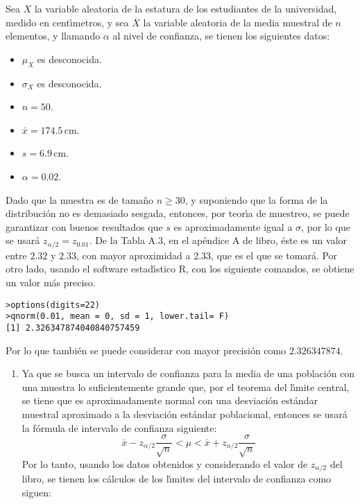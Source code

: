 \begin{solucion}
 Sea $X$ la variable aleatoria de la estatura de los estudiantes de la universidad, medido en cent\'{\i}metros, y sea $\overline{X}$ la variable aleatoria de la media muestral de $n$ elementos, y llamando $\alpha$ al nivel de confianza, se tienen los siguientes datos:
 \begin{itemize}
  \item $\mu_X$ es desconocida.
  \item $\sigma_X$ es desconocida.
  \item $n = 50$.
  \item $\bar{x} = 174.5\,$cm.
  \item $s=6.9\,$cm.
  \item $\alpha=0.02$.
 \end{itemize}
 Dado que la muestra es de tama\~no $n\geq 30$, y suponiendo que la forma de la distribuci\'on no es demasiado sesgada, entonces, por teor\'{\i}a de muestreo, se puede garantizar con buenos resultados que $s$ es aproximadamente igual a $\sigma$, por lo que se usar\'a $z_{\alpha/2} = z_{0.01}$. De la Tabla A.3, en el ap\'endice A de libro, \'este es un valor entre $2.32$ y $2.33$, con mayor aproximidad a $2.33$, que es el que se tomar\'a. Por otro lado, usando el software estad\'{\i}stico R, con los siguiente comandos, se obtiene un valor m\'as preciso.
 \begin{verbatim}
>options(digits=22)
>qnorm(0.01, mean = 0, sd = 1, lower.tail= F)
[1] 2.326347874040840757459
 \end{verbatim}
 \vspace{-0.5cm}
 Por lo que tambi\'en se puede considerar con mayor precisi\'on como $2.326347874$.
 \begin{enumerate}
  \item Ya que se busca un intervalo de confianza para la media de una poblaci\'on con una muestra lo suficientemente grande que, por el teorema del l\'{\i}mite central, se tiene que es aproximadamente normal con una desviaci\'on est\'andar muestral aproximado a la desviaci\'on est\'andar poblacional, entonces se usar\'a la f\'ormula de intervalo de confianza siguiente:
  \begin{equation*}
   \bar{x} - z_{\alpha/2}\frac{\sigma}{\sqrt{n}} < \mu < \bar{x} + z_{\alpha/2}\frac{\sigma}{\sqrt{n}}
  \end{equation*}
  Por lo tanto, usando los datos obtenidos y considerando el valor de $z_{\alpha/2}$ del libro, se tienen los c\'alculos de los l\'{\i}mites del intervalo de confianza como siguen:

\end{enumerate}
\end{solucion}
